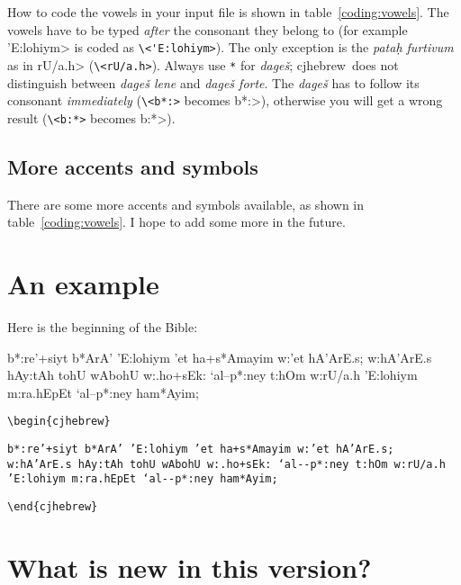 \documentclass[a4paper,10pt]{article}
\def\cjh{\textsf{cjhebrew}}
\def\!#1!{\texttt{#1}}
\begin{document}
How to code the vowels in your input file is shown in
table~\ref{coding:vowels}. The vowels have to be typed
\textit{after} the consonant they belong to (for example
\<'E:lohiym> is coded as \verb+\<'E:lohiym>+). The only exception
is the \textit{pata\d{h} furtivum} as in \<rU/a.h>
(\verb+\<rU/a.h>+). Always use \verb+*+ for \textit{dage\v{s}};
\cjh\ does not distinguish between \textit{dage\v{s} lene} and
\textit{dage\v{s} forte}. The \textit{dage\v{s}} has to follow its
consonant \textit{immediately} (\verb+\<b*:>+ becomes \<b*:>),
otherwise you will get a wrong result (\verb+\<b:*>+ becomes
\<b:*>).

\subsection{More accents and symbols}

There are some more accents and symbols available, as shown in
table~\ref{coding:vowels}. I hope to add some more in the future.


\section{An example}

Here is the beginning of the Bible:

\bigskip

\begin{cjhebrew}

b*:re'+siyt b*ArA' 'E:lohiym 'et ha+s*Amayim w:'et hA'ArE.s;
w:hA'ArE.s hAy:tAh tohU wAbohU w:.ho+sEk: `al--p*:ney t:hOm
w:rU/a.h 'E:lohiym m:ra.hEpEt `al--p*:ney ham*Ayim;

\end{cjhebrew}

\bigskip

\bgroup

\raggedright

\verb+\begin{cjhebrew}+

\!b*:re'+siyt b*ArA' 'E:lohiym 'et ha+s*Amayim w:'et hA'ArE.s;
w:hA'ArE.s hAy:tAh tohU wAbohU w:.ho+sEk: `al-\/-p*:ney t:hOm
w:rU/a.h 'E:lohiym m:ra.hEpEt `al-\/-p*:ney ham*Ayim;!

\verb+\end{cjhebrew}+

\egroup

\section{What is new in this version?}
\end{document}
